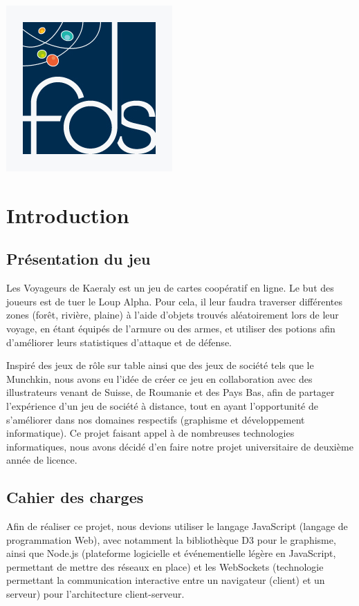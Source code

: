 \documentclass[12pt]{report}
\begin{document}
\begin{titlepage}
\begin{center}
			\vfill

			\includegraphics[scale=0.3]{logo-fds.jpg}~

		\end{center}

	\end{titlepage}

	\tableofcontents

	\chapter*{Introduction}

		\section*{Présentation du jeu}
  	Les Voyageurs de Kaeraly est un jeu de cartes coopératif en ligne. Le but des joueurs est de tuer le Loup Alpha. Pour cela, il leur faudra traverser différentes zones (forêt, rivière, plaine) à l'aide d'objets trouvés aléatoirement lors de leur voyage, en étant équipés de l'armure ou des armes, et utiliser des potions afin d'améliorer leurs statistiques d'attaque et de défense.

  	Inspiré des jeux de rôle sur table ainsi que des jeux de société tels que le Munchkin, nous avons eu l'idée de créer ce jeu en collaboration avec des illustrateurs venant de Suisse, de Roumanie et des Pays Bas, afin de partager l'expérience d'un jeu de société à distance, tout en ayant l'opportunité de s'améliorer dans nos domaines respectifs (graphisme et développement informatique). Ce projet faisant appel à de nombreuses technologies informatiques, nous avons décidé d'en faire notre projet universitaire de deuxième année de licence.

  	\section*{Cahier des charges}
  	Afin de réaliser ce projet, nous devions utiliser le langage JavaScript (langage de programmation Web), avec notamment la bibliothèque D3 pour le graphisme, ainsi que Node.js (plateforme logicielle et événementielle légère en JavaScript, permettant de mettre des réseaux en place) et les WebSockets (technologie permettant la communication interactive entre un navigateur (client) et un serveur) pour l'architecture client-serveur.
\end{document}
